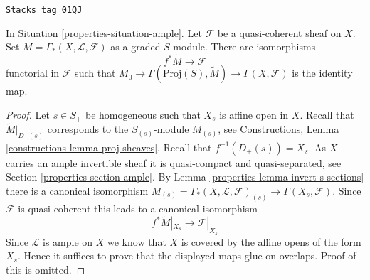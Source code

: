 \begin{lemma}
\label{properties-lemma-ample-quasi-coherent}
\href{https://stacks.math.columbia.edu/tag/01QJ}{\texttt{Stacks tag 01QJ}}

In Situation \ref{properties-situation-ample}.
Let $\mathcal{F}$ be a quasi-coherent sheaf on $X$.
Set $M = \Gamma_*(X, \mathcal{L}, \mathcal{F})$ as a graded $S$-module.
There are isomorphisms
$$
f^*\widetilde{M} \longrightarrow \mathcal{F}
$$
functorial in $\mathcal{F}$ such that
$M_0 \to \Gamma(\text{Proj}(S), \widetilde{M}) \to \Gamma(X, \mathcal{F})$
is the identity map.
\end{lemma}

\begin{proof}

Let $s \in S_{+}$ be homogeneous such that $X_s$ is affine open in $X$.
Recall that $\widetilde{M}|_{D_{+}(s)}$ corresponds to the
$S_{(s)}$-module $M_{(s)}$, see
Constructions, Lemma \ref{constructions-lemma-proj-sheaves}.
Recall that $f^{-1}(D_{+}(s)) = X_s$.
As $X$ carries an ample invertible sheaf it is quasi-compact and
quasi-separated, see Section \ref{properties-section-ample}.
By Lemma \ref{properties-lemma-invert-s-sections} there is a canonical isomorphism
$M_{(s)} = \Gamma_*(X, \mathcal{L}, \mathcal{F})_{(s)} \to
\Gamma(X_s, \mathcal{F})$.
Since $\mathcal{F}$ is quasi-coherent this leads to
a canonical isomorphism
$$
f^*\widetilde{M}|_{X_s} \to \mathcal{F}|_{X_s}
$$
Since $\mathcal{L}$ is ample on $X$ we know that $X$ is covered
by the affine opens of the form $X_s$. Hence it suffices to prove
that the displayed maps glue on overlaps. Proof of this is
omitted.
\end{proof}

